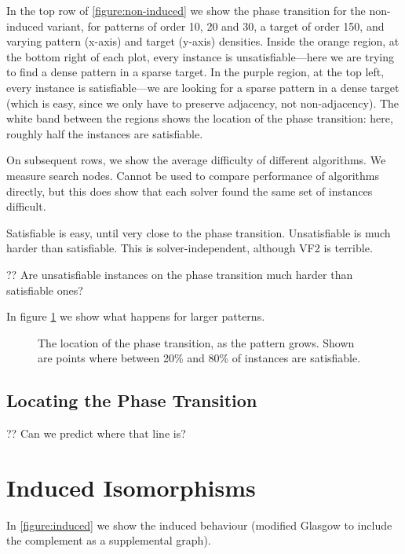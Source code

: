 \documentclass[letterpaper]{article}
\begin{document}
In the top row of \cref{figure:non-induced} we show the phase transition for the non-induced
variant, for patterns of order 10, 20 and 30, a target of order 150, and varying pattern (x-axis)
and target (y-axis) densities. Inside the orange region, at the bottom right of each plot, every
instance is unsatisfiable---here we are trying to find a dense pattern in a sparse target. In the
purple region, at the top left, every instance is satisfiable---we are looking for a sparse pattern
in a dense target (which is easy, since we only have to preserve adjacency, not non-adjacency). The
white band between the regions shows the location of the phase transition: here, roughly half the
instances are satisfiable.

On subsequent rows, we show the average difficulty of different algorithms.  We measure search
nodes. Cannot be used to compare performance of algorithms directly, but this does show that each
solver found the same set of instances difficult.

Satisfiable is easy, until very close to the phase transition. Unsatisfiable is much harder than
satisfiable. This is solver-independent, although VF2 is terrible.

?? Are unsatisfiable instances on the phase transition much harder than satisfiable ones?

In figure \cref{figure:phase-transition-bands} we show what happens for larger patterns.

\begin{figure}[tb]
    
    \caption{The location of the phase transition, as the pattern grows. Shown are points where
    between 20\% and 80\% of instances are satisfiable.}
    \label{figure:phase-transition-bands}
\end{figure}

\subsection{Locating the Phase Transition}

?? Can we predict where that line is?

\lipsum[6]

\section{Induced Isomorphisms}

In \cref{figure:induced} we show the induced behaviour (modified Glasgow to include the complement
as a supplemental graph).
\end{document}
